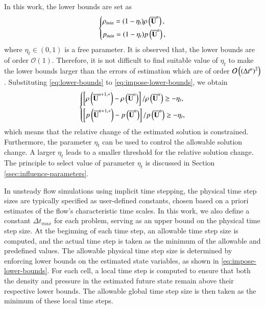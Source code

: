 In this work, the lower bounds are set as 
\begin{equation}
\label{eq:lower-bounds}
    \begin{dcases}
        \rho_{min}= (1-\eta_t) \rho \left(\overline{\mathbf{U}}^n\right), \\
        p_{min}= (1-\eta_t) p \left(\overline{\mathbf{U}}^n\right),
    \end{dcases}
\end{equation}
where $\eta_t \in (0,1)$ is a free parameter. It is observed that, 
the lower bounds are of order $\mathcal{O}\left(1\right)$. Therefore,
it is not difficult to find suitable value of $\eta_t$ to make the lower bounds larger than the errors of estimation which are of order $\mathcal{O}\left(\left(\mathrm\Delta t^n\right)^2\right)$. Substituting \eqref{eq:lower-bounds} to \eqref{eq:impose-lower-bounds}, we obtain
\begin{equation}
    \begin{dcases}
        \left[\rho \left(\overline{\mathbf{U}}^{n+1,*}\right)- \rho \left(\overline{\mathbf{U}}^n\right)\right]/\rho \left(\overline{\mathbf{U}}^n\right) \geq -\eta_t , \\
        \left[p \left(\overline{\mathbf{U}}^{n+1,*}\right)- p \left(\overline{\mathbf{U}}^n\right)\right]/p \left(\overline{\mathbf{U}}^n\right) \geq -\eta_t ,
    \end{dcases}
\end{equation}
which means that the relative change of the estimated solution is constrained. Furthermore, the parameter $\eta_t$ can be used to control the allowable solution change. A larger $\eta_t$ leads to a smaller threshold for the relative solution change. The principle to select value of parameter $\eta_t$ is discussed in Section \ref{ssec:influence-parameters}.

In unsteady flow simulations using implicit time stepping, the physical time step sizes are typically specified as user-defined constants, chosen based on a priori estimates of the flow’s characteristic time scales. 
In this work, we also define a constant $\Delta t_{max}$ for each problem, serving as an upper bound on the physical time step size. At the beginning of each time step, an allowable time step size is computed, and the actual time step is taken as the minimum of the allowable and predefined values.
The allowable physical time step size is determined by enforcing lower bounds on the estimated state variables, as shown in \eqref{eq:impose-lower-bounds}. For each cell, a local time step is computed to ensure that both the density and pressure in the estimated future state remain above their respective lower bounds. The allowable global time step size is then taken as the minimum of these local time steps.


